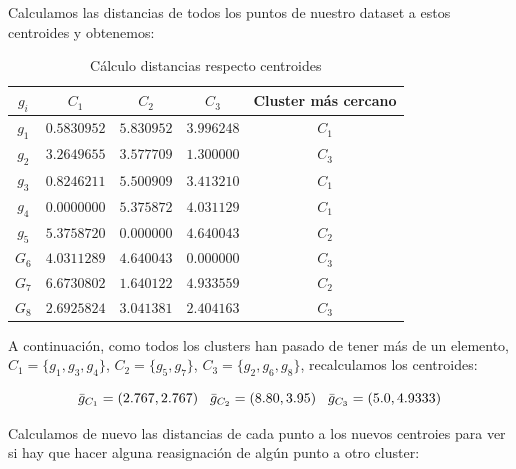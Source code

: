 \begin{ejemplo}
    Calculamos las distancias de todos los puntos de nuestro dataset a estos centroides y obtenemos:

    \begin{table}[h]
        \centering
        \begin{tabular}{|c|c|c|c|c|}
            \hline
            \textbf{$g_{i}$} & \textbf{$C_{1}$} & \textbf{$C_{2}$} & \textbf{$C_{3}$} & \textbf{Cluster más cercano}\\
            \hline
            $g_{1}$ & $0.5830952$ & $5.830952$ & $3.996248$ & $C_{1}$\\
            \hline
            $g_{2}$ & $3.2649655$ & $3.577709$  & $1.300000$ & $C_{3}$\\
            \hline
            $g_{3}$ & $0.8246211$ & $5.500909$ & $3.413210$ & $C_{1}$\\
            \hline
            $g_{4}$ & $0.0000000$ & $5.375872$ & $4.031129$ & $C_{1}$\\
            \hline
            $g_{5}$ & $5.3758720$ & $0.000000$ & $4.640043$ & $C_{2}$\\
            \hline
            $G_{6}$ & $4.0311289$ & $4.640043$ & $0.000000$ & $C_{3}$\\
            \hline
            $G_{7}$ & $6.6730802$ & $1.640122$ & $4.933559$ & $C_{2}$\\
            \hline
            $G_{8}$ & $2.6925824$ & $3.041381$ & $2.404163$ & $C_{3}$ \\
            \hline
            
        \end{tabular}
        \caption{Cálculo distancias respecto centroides}

    \end{table}

    A continuación, como todos los clusters han pasado de tener más de un elemento,$C_{1} = \{g_{1},g_{3},g_{4}\}$,
    $C_{2} = \{g_{5},g_{7}\}$, $C_{3} = \{g_{2},g_{6},g_{8}\}$, recalculamos los centroides:

    \[
    \bar{g}_{C_{1}} = (2.767,2.767) \hspace{0.3cm} \bar{g}_{C_{2}} = (8.80,3.95) \hspace{0.3cm} \bar{g}_{C_{3}} = (5.0,4.9333)
    \]

    Calculamos de nuevo las distancias de cada punto a los nuevos centroies para ver si hay que hacer alguna reasignación de algún punto
    a otro cluster:


\end{ejemplo}
